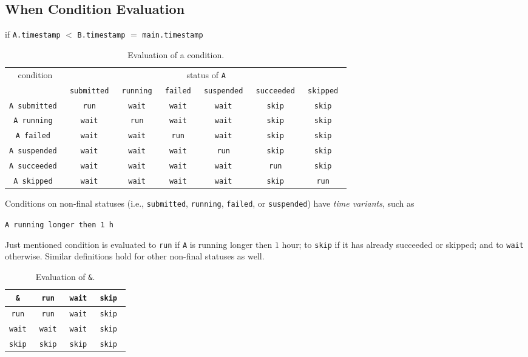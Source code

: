 \documentclass[a4paper,12pt,english,oneside]{book}
\begin{document}
\subsection{When Condition Evaluation}

if \verb|A.timestamp| $<$ \verb|B.timestamp| $=$ \verb|main.timestamp|
\begin{landscape}
\begin{table}
\centering
\begin{tabular}{c|cccccc}
\toprule
\multirow{2}{*}{condition} & \multicolumn{6}{c}{status of \texttt{A}} \\
\cmidrule(rl){2-7}
                    & \tt submitted & \tt running & \tt failed & \tt suspended & \tt succeeded & \tt skipped \\
\midrule
\tt A submitted     & \tt run       & \tt wait    & \tt wait   & \tt wait      & \tt skip      & \tt skip    \\
\tt A running       & \tt wait      & \tt run     & \tt wait   & \tt wait      & \tt skip      & \tt skip    \\
\tt A failed        & \tt wait      & \tt wait    & \tt run    & \tt wait      & \tt skip      & \tt skip    \\
\tt A suspended     & \tt wait      & \tt wait    & \tt wait   & \tt run       & \tt skip      & \tt skip    \\
\tt A succeeded     & \tt wait      & \tt wait    & \tt wait   & \tt wait      & \tt run       & \tt skip    \\
\tt A skipped       & \tt wait      & \tt wait    & \tt wait   & \tt wait      & \tt skip      & \tt run     \\
\bottomrule
\end{tabular}
\caption{Evaluation of a condition.}
\end{table}
\end{landscape}
Conditions on non-final statuses (i.e., \verb|submitted|, \verb|running|, \verb|failed|, or \verb|suspended|) have \emph{time variants}, such as
\begin{center}
\verb|A running longer then 1 h|
\end{center}
Just mentioned condition is evaluated to \verb|run| if \verb|A| is running longer then $1$ hour; to \verb|skip| if it has already succeeded or skipped; and to \verb|wait| otherwise. Similar definitions hold for other non-final statuses as well.

\begin{table}
\centering
\begin{tabular}{c|ccc}
\toprule
\tt \&   & \tt run  & \tt wait & \tt skip \\
\midrule
\tt run  & \tt run  & \tt wait & \tt skip \\
\tt wait & \tt wait & \tt wait & \tt skip \\
\tt skip & \tt skip & \tt skip & \tt skip \\
\bottomrule
\end{tabular}
\caption{Evaluation of \texttt{\&}.}
\end{table}
\end{document}
